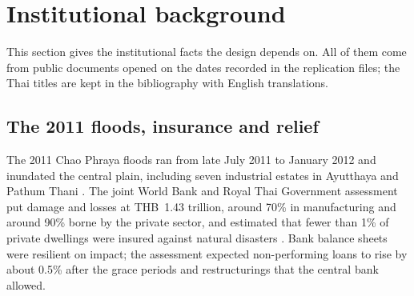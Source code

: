 \section{Institutional background}\label{sec:background}

This section gives the institutional facts the design depends on. All of them come from public documents opened on the dates recorded in the replication files; the Thai titles are kept in the bibliography with English translations.

\subsection{The 2011 floods, insurance and relief}

The 2011 Chao Phraya floods ran from late July 2011 to January 2012 and inundated the central plain, including seven industrial estates in Ayutthaya and Pathum Thani \citep{komori2012characteristics,haraguchi2013flood}. The joint World Bank and Royal Thai Government assessment put damage and losses at THB~1.43 trillion, around 70\% in manufacturing and around 90\% borne by the private sector, and estimated that fewer than 1\% of private dwellings were insured against natural disasters \citep{worldbank2012thai}. Bank balance sheets were resilient on impact; the assessment expected non-performing loans to rise by about 0.5\% after the grace periods and restructurings that the central bank allowed.


